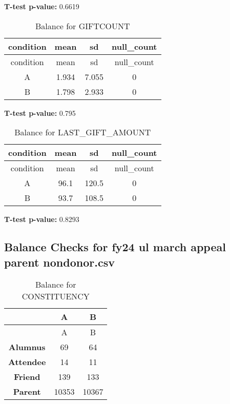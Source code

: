 \documentclass[
]{article}
\begin{document}
\textbf{T-test p-value:} 0.6619\\
\pagebreak

\begin{longtable}[]{@{}cccc@{}}
\caption{Balance for GIFTCOUNT}\tabularnewline
\toprule\noalign{}
condition & mean & sd & null\_count \\
\midrule\noalign{}
\endfirsthead
\toprule\noalign{}
condition & mean & sd & null\_count \\
\midrule\noalign{}
\endhead
\bottomrule\noalign{}
\endlastfoot
A & 1.934 & 7.055 & 0 \\
B & 1.798 & 2.933 & 0 \\
\end{longtable}

\textbf{T-test p-value:} 0.795\\
\pagebreak

\begin{longtable}[]{@{}cccc@{}}
\caption{Balance for LAST\_GIFT\_AMOUNT}\tabularnewline
\toprule\noalign{}
condition & mean & sd & null\_count \\
\midrule\noalign{}
\endfirsthead
\toprule\noalign{}
condition & mean & sd & null\_count \\
\midrule\noalign{}
\endhead
\bottomrule\noalign{}
\endlastfoot
A & 96.1 & 120.5 & 0 \\
B & 93.7 & 108.5 & 0 \\
\end{longtable}

\textbf{T-test p-value:} 0.8293\\
\pagebreak \clearpage

\subsection{Balance Checks for fy24 ul march appeal parent
nondonor.csv}\label{balance-checks-for-fy24-ul-march-appeal-parent-nondonor.csv}

\begin{longtable}[]{@{}ccc@{}}
\caption{Balance for CONSTITUENCY}\tabularnewline
\toprule\noalign{}
~ & A & B \\
\midrule\noalign{}
\endfirsthead
\toprule\noalign{}
~ & A & B \\
\midrule\noalign{}
\endhead
\bottomrule\noalign{}
\endlastfoot
\textbf{Alumnus} & 69 & 64 \\
\textbf{Attendee} & 14 & 11 \\
\textbf{Friend} & 139 & 133 \\
\textbf{Parent} & 10353 & 10367 \\
\end{longtable}
\end{document}
